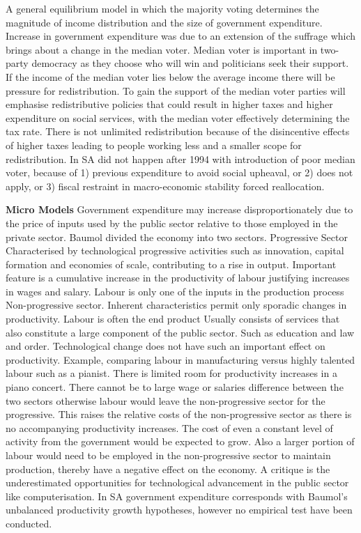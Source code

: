 \documentclass[12pt]{examnotes}
\begin{document}
\ra A general equilibrium model in which the majority voting determines the magnitude of income distribution and the size of government expenditure.
\ra Increase in government expenditure was due to an extension of the suffrage which brings about a change in the median voter.
\ra Median voter is important in two-party democracy as they choose who will win and politicians seek their support.           
\ra  If the income of the median voter lies below the average income there will be pressure for redistribution. To gain the support of the median voter parties will emphasise redistributive policies that could result in higher taxes and higher expenditure on social services, with the median voter effectively determining the tax rate.
\ra There is not unlimited redistribution because of the disincentive effects of higher taxes leading to people working less and a smaller scope for redistribution. 
\ra In SA did not happen after 1994 with introduction of poor median voter, because of 1) previous expenditure to avoid social upheaval, or 2) does not apply, or 3) fiscal restraint in macro-economic stability forced reallocation.

\vspace{12pt}
{\Large\bf Micro Models}
\ra Government expenditure may increase disproportionately due to the price of inputs used by the public sector relative to those employed in the private sector.
\ra Baumol divided the economy into two sectors.
 Progressive Sector
\rna Characterised by technological progressive activities such as innovation, capital formation and economies of scale, contributing to a rise in output.
\rna Important feature is a cumulative increase in the productivity of labour justifying increases in wages and salary.
\rna Labour is only one of the inputs in the production process
 Non-progressive sector.
\rna Inherent characteristics permit only sporadic changes in productivity.
\rna Labour is often the end product
\rna Usually consists of services that also constitute a large component of the public sector. Such as education and law and order.
\rna Technological change does not have such an important effect on productivity.
\ra Example, comparing labour in manufacturing versus highly talented labour such as a pianist. There is limited room for productivity increases in a piano concert.
\ra There cannot be to large wage or salaries difference between the two sectors otherwise labour would leave the non-progressive sector for the progressive. This raises the relative costs of the non-progressive sector as there is no accompanying productivity increases.
\ra The cost of even a constant level of activity from the government would be expected to grow.
\ra Also a larger portion of labour would need to be employed in the non-progressive sector to maintain production, thereby have a negative effect on the economy.
\ra A critique is the underestimated opportunities for technological advancement in the public sector like computerisation.
\ra In SA government expenditure corresponds with Baumol's unbalanced productivity growth hypotheses,  however no empirical test have been conducted.
\end{document}
